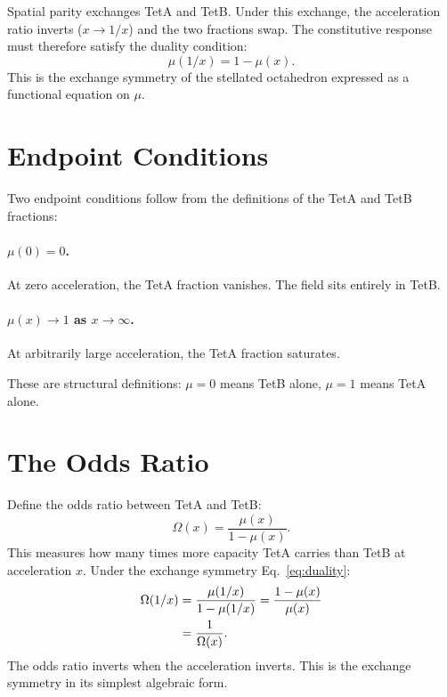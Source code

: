 \documentclass[twocolumn]{iopjournal}
\begin{document}
Spatial parity exchanges TetA and TetB. Under this exchange,
the acceleration ratio inverts ($x \to 1/x$) and the two
fractions swap. The constitutive response must therefore satisfy
the duality condition:
\begin{equation}
  \mu(1/x) = 1 - \mu(x).
  \label{eq:duality}
\end{equation}
This is the exchange symmetry of the stellated octahedron
expressed as a functional equation on $\mu$.


\section*{Endpoint Conditions}

Two endpoint conditions follow from the definitions of the
TetA and TetB fractions:

\paragraph{$\mu(0) = 0$.} At zero acceleration, the TetA
fraction vanishes. The field sits entirely in TetB.

\paragraph{$\mu(x) \to 1$ as $x \to \infty$.} At arbitrarily
large acceleration, the TetA fraction saturates.

These are structural definitions: $\mu = 0$ means TetB alone,
$\mu = 1$ means TetA alone.


\section*{The Odds Ratio}

Define the odds ratio between TetA and TetB:
\begin{equation}
  \Omega(x) = \frac{\mu(x)}{1 - \mu(x)}.
  \label{eq:odds}
\end{equation}
This measures how many times more capacity TetA carries than
TetB at acceleration $x$. Under the exchange symmetry
Eq.~\eqref{eq:duality}:
\begin{align}
  \Omega(1/x)
  &= \frac{\mu(1/x)}{1 - \mu(1/x)}
   = \frac{1 - \mu(x)}{\mu(x)} \notag \\
  &= \frac{1}{\Omega(x)}.
  \label{eq:odds_duality}
\end{align}
The odds ratio inverts when the acceleration inverts. This is the
exchange symmetry in its simplest algebraic form.
\end{document}
